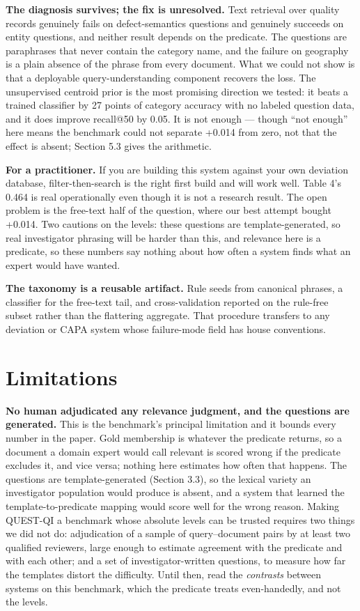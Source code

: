 \documentclass[acmsmall]{acmart}
\begin{document}
\textbf{The diagnosis survives; the fix is unresolved.} Text retrieval over quality records genuinely fails on defect-semantics questions and genuinely succeeds on entity questions, and neither result depends on the predicate. The questions are paraphrases that never contain the category name, and the failure on geography is a plain absence of the phrase from every document. What we could not show is that a deployable query-understanding component recovers the loss. The unsupervised centroid prior is the most promising direction we tested: it beats a trained classifier by 27 points of category accuracy with no labeled question data, and it does improve recall@50 by 0.05. It is not enough --- though ``not enough'' here means the benchmark could not separate +0.014 from zero, not that the effect is absent; Section 5.3 gives the arithmetic.

\textbf{For a practitioner.} If you are building this system against your own deviation database, filter-then-search is the right first build and will work well. Table 4's 0.464 is real operationally even though it is not a research result. The open problem is the free-text half of the question, where our best attempt bought +0.014. Two cautions on the levels: these questions are template-generated, so real investigator phrasing will be harder than this, and relevance here is a predicate, so these numbers say nothing about how often a system finds what an expert would have wanted.

\textbf{The taxonomy is a reusable artifact.} Rule seeds from canonical phrases, a classifier for the free-text tail, and cross-validation reported on the rule-free subset rather than the flattering aggregate. That procedure transfers to any deviation or CAPA system whose failure-mode field has house conventions.


\section{Limitations}
\textbf{No human adjudicated any relevance judgment, and the questions are generated.} This is the benchmark's principal limitation and it bounds every number in the paper. Gold membership is whatever the predicate returns, so a document a domain expert would call relevant is scored wrong if the predicate excludes it, and vice versa; nothing here estimates how often that happens. The questions are template-generated (Section 3.3), so the lexical variety an investigator population would produce is absent, and a system that learned the template-to-predicate mapping would score well for the wrong reason. Making QUEST-QI a benchmark whose absolute levels can be trusted requires two things we did not do: adjudication of a sample of query--document pairs by at least two qualified reviewers, large enough to estimate agreement with the predicate and with each other; and a set of investigator-written questions, to measure how far the templates distort the difficulty. Until then, read the \textit{contrasts} between systems on this benchmark, which the predicate treats even-handedly, and not the levels.
\end{document}
